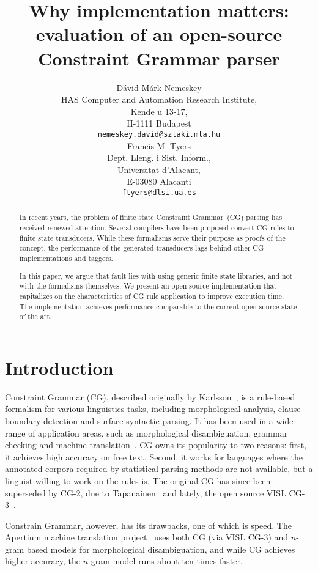 \documentclass[11pt]{article}
\title{Why implementation matters: evaluation of an open-source Constraint Grammar parser}
\author{Dávid Márk Nemeskey \\
HAS Computer and Automation Research Institute, \\
Kende u 13-17, \\
H-1111 Budapest \\
{\tt nemeskey.david@sztaki.mta.hu} \\\And
Francis M. Tyers \\
Dept. Lleng. i Sist. Inform., \\
Universitat d'Alacant, \\
E-03080 Alacanti \\
{\tt ftyers@dlsi.ua.es} \\}
\date{}
\begin{document}
\maketitle

\begin{abstract}
  In recent years, the problem of finite state Constraint Grammar~(CG) parsing
  has received renewed attention. Several compilers have been proposed
  convert CG rules to finite state transducers. While these formalisms serve
  their purpose as proofs of the concept, the performance of the generated
  transducers lags behind other CG implementations and taggers.
  
  In this paper, we argue that fault lies with using generic finite state
  libraries, and not with the formalisms themselves. We present an open-source
  implementation that capitalizes on the characteristics of CG rule
  application to improve execution time. The implementation achieves performance
  comparable to the current open-source state of the art.
\end{abstract}



\section{Introduction}

Constraint Grammar (CG), described originally by Karlsson~,
is a rule-based formalism for various linguistics tasks, including morphological
analysis, clause boundary detection and surface syntactic parsing. It has
been used in a wide range of application areas, such as morphological
disambiguation, grammar checking and machine translation~\cite{Bick:2011}. CG
owns its popularity to two reasons: first, it achieves high accuracy on free
text. Second, it works for languages where the annotated corpora required by
statistical parsing methods are not available, but a linguist willing to work on
the rules is. The original CG has since been superseded by CG-2, due to
Tapanainen~ and lately, the open source VISL
CG-3~\cite{Bick:2000,Didriksen:2011}.

Constrain Grammar, however, has its drawbacks, one of which is speed. The
Apertium machine translation project~\cite{Apertium:2011} uses both CG (via
VISL CG-3) and $n$-gram based models for morphological disambiguation, and while
CG achieves higher accuracy, the $n$-gram model runs about ten times faster.
\end{document}
